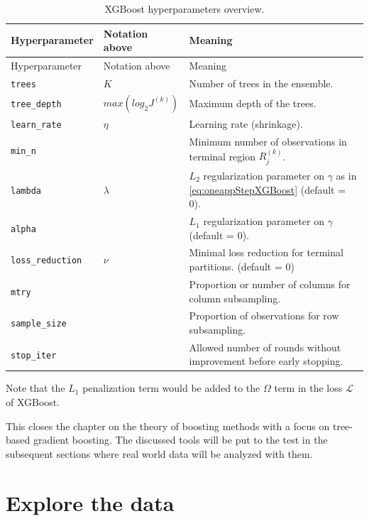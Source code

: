 \documentclass[
]{book}
\begin{document}
\begin{longtable}[]{@{}
  >{\raggedright\arraybackslash}p{}
  >{\raggedright\arraybackslash}p{}
  >{\raggedright\arraybackslash}p{}@{}}
\caption{\label{tab:xgboostHyper} XGBoost hyperparameters overview.}\tabularnewline
\toprule
Hyperparameter & Notation above & Meaning \\
\midrule
\endfirsthead
\toprule
Hyperparameter & Notation above & Meaning \\
\midrule
\endhead
\texttt{trees} & \(K\) & Number of trees in the ensemble. \\
\texttt{tree\_depth} & \(max(log_2J^{(k)})\) & Maximum depth of the trees. \\
\texttt{learn\_rate} & \(\eta\) & Learning rate (shrinkage). \\
\texttt{min\_n} & & Minimum number of observations in terminal region \(R^{(k)}_j\). \\
\texttt{lambda} & \(\lambda\) & \(L_2\) regularization parameter on \(\gamma\) as in \eqref{eq:oneappStepXGBoost} (default = 0). \\
\texttt{alpha} & & \(L_1\) regularization parameter on \(\gamma\) (default = 0). \\
\texttt{loss\_reduction} & \(\nu\) & Minimal loss reduction for terminal partitions. (default = 0) \\
\texttt{mtry} & & Proportion or number of columns for column subsampling. \\
\texttt{sample\_size} & & Proportion of observations for row subsampling. \\
\texttt{stop\_iter} & & Allowed number of rounds without improvement before early stopping. \\
\bottomrule
\end{longtable}

Note that the \(L_1\) penalization term would be added to the \(\Omega\) term in the loss \(\mathcal{L}\) of XGBoost.

This closes the chapter on the theory of boosting methods with a focus on tree-based gradient boosting. The discussed tools will be put to the test in the subsequent sections where real world data will be analyzed with them.

\hypertarget{eda}{%
\chapter{Explore the data}\label{eda}}
\end{document}
